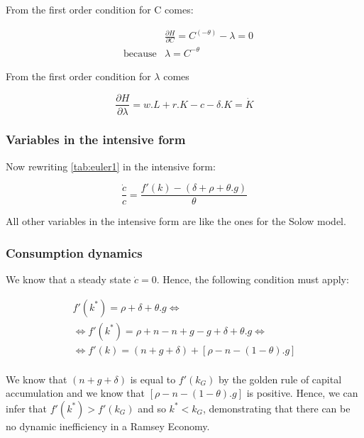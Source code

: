 From the first order condition for C comes: 

\begin{equation}
\begin{aligned}
& & \frac{ \partial H}{\partial C}=C^{(-\theta)}-\lambda=0 \\
&  \text{because} 
& \lambda=C^{-\theta}
\end{aligned}
\end{equation}

From the first order condition for $\lambda$ comes 

\begin{equation}
    \frac{ \partial H}{ \partial \lambda}=w.L + r.K - c - \delta.K=\dot{K}
\end{equation}

\subsubsection{Variables in the intensive form}
Now rewriting \ref{tab:euler1} in the intensive form:

\begin{equation}
    \frac{\dot{c}}{c}=\frac{f'(k)-(\delta + \rho + \theta.g)}{\theta}
    \label{tab:euler intensive}
\end{equation}

All other variables in the intensive form are like the ones for the Solow model. 

\subsubsection{Consumption dynamics}

We know that a steady state $\dot{c}=0$. Hence, the following condition must apply: 

\begin{equation*}
\begin{aligned}
    f'(k^*)=\rho + \delta + \theta.g \iff\\
 \iff f'(k^*)=\rho + n - n + g - g + \delta + \theta . g \iff \\
  \iff  f'(k)=(n+g+\delta)+[\rho - n - (1-\theta).g]
\end{aligned}
\end{equation*}
\paragraph{}

We know that $(n+g+\delta)$ is equal to $f'(k_{G})$ by the golden rule of capital accumulation and we know that $[\rho - n - (1-\theta).g]$ is positive. Hence, we can infer that $f'(k^*)>f'(k_{G})$ and so $k^*<k_{G}$, demonstrating that there can be no dynamic inefficiency in a Ramsey Economy.

